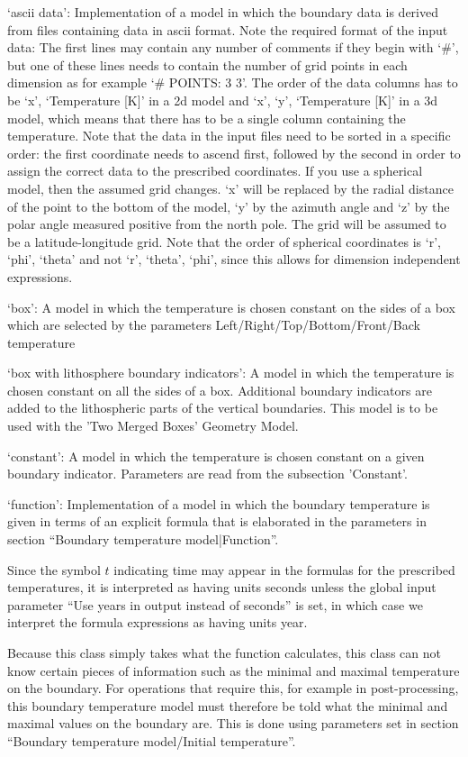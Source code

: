 \begin{itemize}
`ascii data': Implementation of a model in which the boundary data is derived from files containing data in ascii format. Note the required format of the input data: The first lines may contain any number of comments if they begin with `\#', but one of these lines needs to contain the number of grid points in each dimension as for example `\# POINTS: 3 3'. The order of the data columns has to be `x', `Temperature [K]' in a 2d model and  `x', `y', `Temperature [K]' in a 3d model, which means that there has to be a single column containing the temperature. Note that the data in the input files need to be sorted in a specific order: the first coordinate needs to ascend first, followed by the second in order to assign the correct data to the prescribed coordinates. If you use a spherical model, then the assumed grid changes. `x' will be replaced by the radial distance of the point to the bottom of the model, `y' by the azimuth angle and `z' by the polar angle measured positive from the north pole. The grid will be assumed to be a latitude-longitude grid. Note that the order of spherical coordinates is `r', `phi', `theta' and not `r', `theta', `phi', since this allows for dimension independent expressions.

`box': A model in which the temperature is chosen constant on the sides of a box which are selected by the parameters Left/Right/Top/Bottom/Front/Back temperature

`box with lithosphere boundary indicators': A model in which the temperature is chosen constant on all the sides of a box. Additional boundary indicators are added to the lithospheric parts of the vertical boundaries. This model is to be used with the 'Two Merged Boxes' Geometry Model.

`constant': A model in which the temperature is chosen constant on a given boundary indicator.  Parameters are read from the subsection 'Constant'.

`function': Implementation of a model in which the boundary temperature is given in terms of an explicit formula that is elaborated in the parameters in section ``Boundary temperature model|Function''. 

Since the symbol $t$ indicating time may appear in the formulas for the prescribed temperatures, it is interpreted as having units seconds unless the global input parameter ``Use years in output instead of seconds'' is set, in which case we interpret the formula expressions as having units year.

Because this class simply takes what the function calculates, this class can not know certain pieces of information such as the minimal and maximal temperature on the boundary. For operations that require this, for example in post-processing, this boundary temperature model must therefore be told what the minimal and maximal values on the boundary are. This is done using parameters set in section ``Boundary temperature model/Initial temperature''.


\end{itemize}
